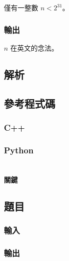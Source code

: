 \documentclass[a4paper,10pt]{article}
\begin{document}
僅有一整數 $n < 2^{31}$。

\subsubsection{輸出}

$n$ 在英文的念法。

\subsection{解析}

\subsection{參考程式碼}

\subsubsection{C++}



\subsubsection{Python}



\section{}

\paragraph{關鍵}

\subsection{題目}



\subsubsection{輸入}



\subsubsection{輸出}
\end{document}
